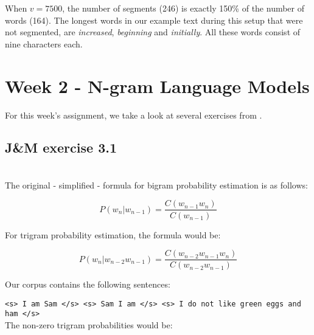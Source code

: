 \documentclass[a4paper, 11pt]{article}
\begin{document}
When $v=7500$, the number of segments (246) is exactly 150\% of the number of words (164). The longest words in our example text during this setup that were not segmented, are \textit{increased}, \textit{beginning} and \textit{initially}. All these words consist of nine characters each.

\section{Week 2 - N-gram Language Models}

For this week's assignment, we take a look at several exercises from \citet{jurafskyspeech}.

\subsection{J\&M exercise 3.1}

\noindent{}\\


The original - simplified - formula for bigram probability estimation is as follows:

$$P(w_{n} | w_{n-1}) = \frac{C(w_{n-1}w_{n})}{C(w_{n-1})}$$

For trigram probability estimation, the formula would be:

$$P(w_{n} | w_{n-2} w_{n-1}) = \frac{C(w_{n-2} w_{n-1}w_{n})}{C(w_{n-2} w_{n-1})}$$

Our corpus contains the following sentences:

\texttt{<s> I am Sam </s> \enspace <s> Sam I am </s> \enspace <s> I do not  like green eggs and ham </s>}\\

The non-zero trigram probabilities would be:
\end{document}
